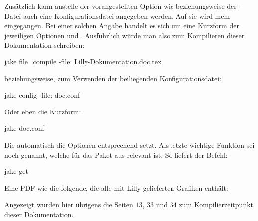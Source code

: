Zusätzlich kann anstelle der vorangestellten Option wie  beziehungsweise der -Datei auch eine Konfigurationsdatei angegeben werden. Auf sie wird  %
mehr eingegangen. Bei einer solchen Angabe handelt es sich um eine Kurzform der jeweiligen Optionen  und . Ausführlich würde man also zum Kompilieren dieser Dokumentation schreiben:
\begin{bash*}
jake file_compile -file: Lilly-Dokumentation.doc.tex
\end{bash*}
beziehungsweise, zum Verwenden der beiliegenden Konfigurationsdatei:
\begin{bash*}
jake config -file: doc.conf
\end{bash*}
Oder eben die Kurzform:
\begin{bash*}
jake doc.conf
\end{bash*}
Die automatisch die Optionen entsprechend setzt.\smallskip\newline
Als letzte wichtige Funktion sei noch  genannt, welche für das Paket  aus  relevant ist. So liefert der Befehl:
\begin{bash}
jake get
\end{bash}
Eine PDF wie die folgende, die alle mit Lilly gelieferten Grafiken enthält:
\begin{tcbraster}[raster columns=3, blankest, graphics pages={13,33,34},colback=white]
\end{tcbraster}
Angezeigt wurden hier übrigens die Seiten $13$, $33$ und $34$ zum Kompilierzeitpunkt dieser Dokumentation.
